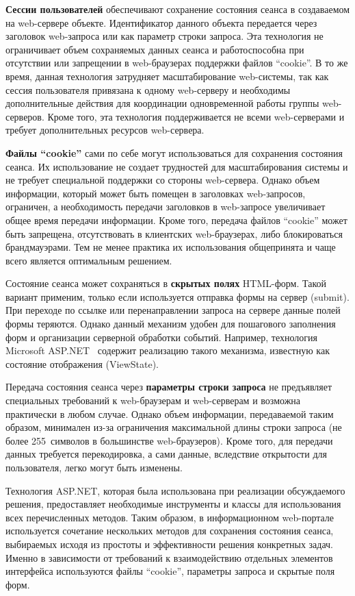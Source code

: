 \begin{multicols}{2}
{}

 \textbf{Сессии пользователей} обеспечивают сохранение состояния сеанса в
создаваемом на web-сервере объекте. Идентификатор данного объекта передается через
заголовок web-запроса или как параметр строки запроса. Эта технология не ограничивает
объем сохраняемых данных сеанса и работоспособна при отсутствии или запрещении в
web-браузерах поддержки файлов ``cookie''. В то же время, данная технология
затрудняет масштабирование web-системы, так как сессия пользователя привязана к
одному web-серверу и необходимы дополнительные действия для координации
одновременной работы группы web-серверов. Кроме того, эта технология поддерживается
не всеми web-серверами и требует дополнительных ресурсов web-сервера.

 \textbf{Файлы ``cookie''} сами по себе могут исполь\-зоваться для сохранения
состояния сеанса. Их использование не создает трудностей для масштабирования системы
и не требует специальной поддержки со стороны web-сервера. Однако объем информации,
который может быть помещен в заголовках web-запросов, ограничен, а необходимость
передачи заголовков в web-запросе увеличивает общее время передачи информации.
Кроме того, передача файлов ``cookie'' может быть запрещена, отсутствовать в
клиентских web-браузерах, либо блокироваться брандмауэрами. Тем не менее практика их
использования общепринята и чаще всего является оптимальным решением.

 Состояние сеанса может сохраняться в \textbf{скрытых полях} HTML-форм. Такой
вариант применим, только если используется отправка формы на сервер (submit). При
переходе по ссылке или пере\-на\-прав\-ле\-нии запроса на сервере данные полей формы
теряются. Однако данный механизм удобен для пошагового заполнения форм и
организации серверной обработки событий. Например, технология Microsoft
ASP.NET~\cite{9bos} содержит реализацию такого механизма, известную как состояние
отображения (ViewState).

 Передача состояния сеанса через \textbf{параметры строки запроса} не
предъявляет специальных требований к web-браузерам и web-серверам и возможна
практически в любом случае. Однако объем информации, передаваемой таким образом,
минимален из-за ограничения максимальной длины строки запроса (не более
255~символов в большинстве web-браузеров). Кроме того, для передачи данных требуется
перекодировка, а сами данные, вследствие открытости для пользователя, легко могут быть
изменены.

 Технология ASP.NET, которая была использована при реализации обсуждаемого
решения, предоставляет необходимые инструменты и классы для использования всех
перечисленных методов. Таким образом, в информационном web-портале используется
сочетание нескольких методов для сохранения состояния сеанса, выбираемых исходя из
простоты и эффективности решения конкретных задач. Именно в зависимости от
требований к взаимодействию отдельных элементов интерфейса используются файлы
``cookie'', параметры запроса и скрытые поля форм.


\end{multicols}
